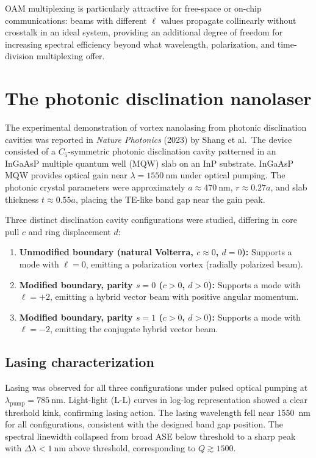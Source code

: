 \documentclass[12pt,a4paper,oneside]{book}
\theoremstyle{plain}
\theoremstyle{definition}
\theoremstyle{remark}
\begin{document}
OAM multiplexing is particularly attractive for free-space or on-chip communications: beams with different $\ell$ values propagate collinearly without crosstalk in an ideal system, providing an additional degree of freedom for increasing spectral efficiency beyond what wavelength, polarization, and time-division multiplexing offer.

\section{The photonic disclination nanolaser}
\label{sec:disclination-nanolaser}

The experimental demonstration of vortex nanolasing from photonic disclination cavities was reported in \textit{Nature Photonics} (2023) by Shang et al.\ The device consisted of a $C_5$-symmetric photonic disclination cavity patterned in an InGaAsP multiple quantum well (MQW) slab on an InP substrate. InGaAsP MQW provides optical gain near $\lambda = \SI{1550}{\nano\metre}$ under optical pumping. The photonic crystal parameters were approximately $a \approx \SI{470}{\nano\metre}$, $r \approx 0.27a$, and slab thickness $t \approx 0.55a$, placing the TE-like band gap near the gain peak.

Three distinct disclination cavity configurations were studied, differing in core pull $c$ and ring displacement $d$:

\begin{enumerate}
  \item \textbf{Unmodified boundary (natural Volterra, $c \approx 0$, $d = 0$):} Supports a mode with $\ell = 0$, emitting a polarization vortex (radially polarized beam).
  \item \textbf{Modified boundary, parity $s=0$ ($c > 0$, $d > 0$):} Supports a mode with $\ell = +2$, emitting a hybrid vector beam with positive angular momentum.
  \item \textbf{Modified boundary, parity $s=1$ ($c > 0$, $d > 0$):} Supports a mode with $\ell = -2$, emitting the conjugate hybrid vector beam.
\end{enumerate}

\subsection{Lasing characterization}
\label{subsec:lasing}

Lasing was observed for all three configurations under pulsed optical pumping at $\lambda_\mathrm{pump} = \SI{785}{\nano\metre}$. Light-light (L-L) curves in log-log representation showed a clear threshold kink, confirming lasing action. The lasing wavelength fell near \SI{1550}{\nano\metre} for all configurations, consistent with the designed band gap position. The spectral linewidth collapsed from broad ASE below threshold to a sharp peak with $\Delta\lambda < \SI{1}{\nano\metre}$ above threshold, corresponding to $Q \gtrsim 1500$.
\end{document}
